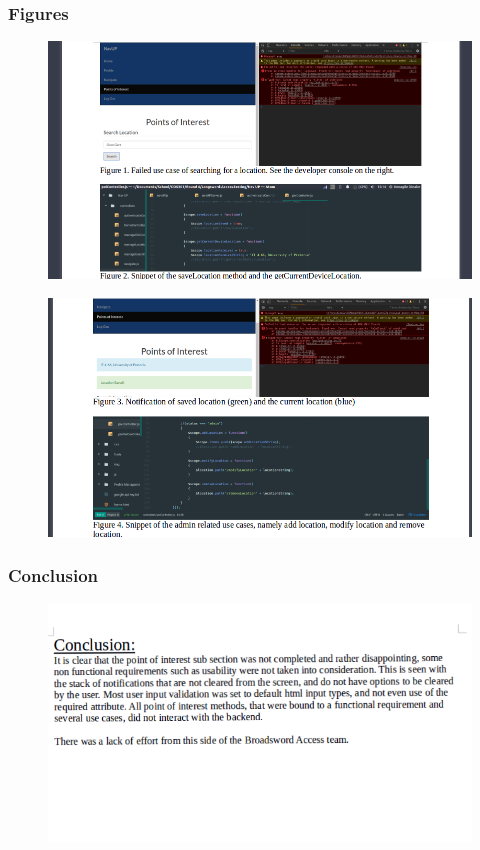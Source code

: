 \documentclass[english]{article}
\begin{document}
\subsubsection{Figures}
\begin{figure}[H]
\hspace*{-2.5cm}
\includegraphics[width=180cm]{fig1-2-poi.png}
\end{figure}
\begin{figure}[H]
\hspace*{-2.5cm}
\includegraphics[width=180cm]{fig3-4-poi.png}
\end{figure}
\subsubsection{Conclusion}
\begin{figure}[H]
\hspace*{-2.5cm}
\includegraphics[width=180cm]{conclusion-poi.png}
\end{figure}
\end{document}
